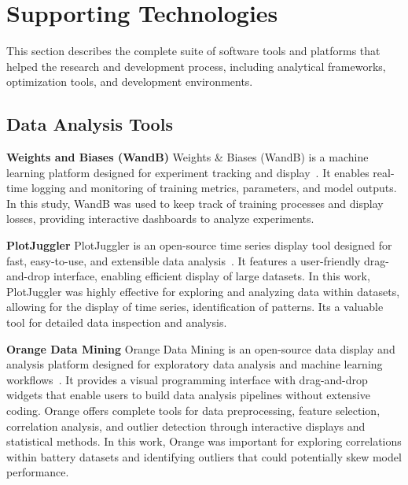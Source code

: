
\section{Supporting Technologies}

This section describes the complete suite of software tools and platforms that helped the research and development process, including analytical frameworks, optimization tools, and development environments.

\subsection{Data Analysis Tools}


\textbf{Weights and Biases (WandB)}
\label{subsec:wandb}
Weights \& Biases (WandB) is a machine learning platform designed for experiment tracking and display~\cite{noauthor_weights_nodate}. It enables real-time logging and monitoring of training metrics, parameters, and model outputs. In this study, WandB was used to keep track of training processes and display losses, providing interactive dashboards to analyze experiments.

\textbf{PlotJuggler}
PlotJuggler is an open-source time series display tool designed for fast, easy-to-use, and extensible data analysis~\cite{faconti_facontidavideplotjuggler_2025}. It features a user-friendly drag-and-drop interface, enabling efficient display of large datasets. In this work, PlotJuggler was highly effective for exploring and analyzing data within datasets, allowing for the display of time series, identification of patterns. Its a valuable tool for detailed data inspection and analysis.

\textbf{Orange Data Mining}
Orange Data Mining is an open-source data display and analysis platform designed for exploratory data analysis and machine learning workflows~\cite{noauthor_biolaborange3_nodate}. It provides a visual programming interface with drag-and-drop widgets that enable users to build data analysis pipelines without extensive coding. Orange offers complete tools for data preprocessing, feature selection, correlation analysis, and outlier detection through interactive displays and statistical methods. In this work, Orange was important for exploring correlations within battery datasets and identifying outliers that could potentially skew model performance.

